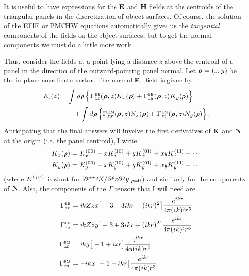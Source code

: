 \documentclass[letterpaper]{article}
\begin{document}
It is useful to have expressions for the $\mathbf{E}$ and $\mathbf{H}$
fields at the centroids of the triangular panels in the
discretization of object surfaces. Of course, the solution 
of the EFIE or PMCHW equations automatically gives us the 
\textit{tangential} components of the fields on the object
surfaces, but to get the normal components we must do a little
more work. 

Thus, consider the fields at a point lying a distance $z$
above the centroid of a panel in the direction of the 
outward-pointing panel normal. Let $\boldsymbol{\rho}=(x,y)$ be the
in-plane coordinate vector. The normal $\mathbf{E}-$field is given by
\begin{align}
E_z(z) 
 &= \int d\boldsymbol{\rho} \, \Big\{ 
             \Gamma_{zx}^{\hbox{\tiny{EE}}}(\boldsymbol{\rho}, z) K_x(\boldsymbol{\rho}) 
            +\Gamma_{zy}^{\hbox{\tiny{EE}}}(\boldsymbol{\rho}, z) K_y(\boldsymbol{\rho}) 
           \Big\}
\nonumber \\
&\qquad
   + \int d\boldsymbol{\rho} \, \Big\{ 
             \Gamma_{zx}^{\hbox{\tiny{EM}}}(\boldsymbol{\rho}, z) N_x(\boldsymbol{\rho}) 
            +\Gamma_{zy}^{\hbox{\tiny{EM}}}(\boldsymbol{\rho}, z) N_y(\boldsymbol{\rho}) 
           \Big\}.
\label{Ezz}
\end{align}
Anticipating that the final answers will involve the 
first derivatives of $\mathbf{K}$ and $\mathbf{N}$ at the origin (i.e. the panel 
centroid), I write
\begin{align*}
 K_x(\boldsymbol{\rho}) &= K_x^{(00)} + x K_x^{(10)} + y K_x^{(01)} + xyK_x^{(11)}
  + \cdots 
\\
 K_y(\boldsymbol{\rho}) &= K_y^{(00)} + x K_y^{(10)} + y K_y^{(01)} + xyK_y^{(11)}
  + \cdots
\end{align*}
(where $K^{(pq)}$ is short 
for $|\partial^{p+q} K/\partial^p x \partial^q y|_{\boldsymbol{\rho}=0}$)
and similarly for the components of $\mathbf{N}$.
Also, the components of the $\Gamma$ tensors that I will need are
\begin{align*}
 \Gamma^{\hbox{\tiny{EE}}}_{zx} &= i k Z zx \big[-3 + 3ikr - (ikr)^2\big]
  \frac{e^{ikr}}{4\pi (ik)^2 r^5}
\\
 \Gamma^{\hbox{\tiny{EE}}}_{zy} &= i k Z zy \big[-3 + 3ikr - (ikr)^2\big]
  \frac{e^{ikr}}{4\pi (ik)^2 r^5}
\\
 \Gamma^{\hbox{\tiny{EM}}}_{zx} &= i k y \big[-1 + ikr\big]
  \frac{e^{ikr}}{4\pi (ik) r^3}
\\
 \Gamma^{\hbox{\tiny{EM}}}_{zy} &= -i k x \big[-1 +ikr\big]
  \frac{e^{ikr}}{4\pi (ik) r^3}
\end{align*}
\end{document}
